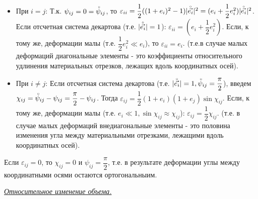 \begin{itemize}
  \item При $i = j$: Т.к. $\psi_{ij} = 0 = \accentset{\circ}{\psi}_{ij}$, то
        $\varepsilon_{ii} = \dfrac{1}{2}((1+e_i)^2 - 1)|\accentset{\circ}{\vec{e_i}}|^2 = (e_i + \dfrac{1}{2}e_i^2)|\accentset{\circ}{\vec{e_i}}|^2$.
        Если отсчетная система декартова (т.е. $|\accentset{\circ}{\vec{e_i}}| = 1$): $\varepsilon_{ii} = (e_i + \dfrac{1}{2}e_i^2)$. Если, к тому же, деформации малы (т.е. $\dfrac{1}{2}e_i^2 \ll e_i$), то $\varepsilon_{ii} = e_i$. (т.е.в случае малых деформаций диагональные элементы - это коэффициенты относительного удлинения материальных отрезков, лежащих вдоль координатных осей).
  \item При $i \not= j$: Если отсчетная система декартова (т.е. $|\accentset{\circ}{\vec{e_i}}| = 1, \accentset{\circ}{\psi}_{ij} = \dfrac{\pi}{2}$), введем $\chi_{ij} = \accentset{\circ}{\psi}_{ij} - \psi_{ij} = \dfrac{\pi}{2} - \psi_{ij}$. Тогда $\varepsilon_{ij} = \dfrac{1}{2}(1+e_i)(1+e_j)\sin{\chi_{ij}}$. Если, к тому же, деформации малы (т.е. $e_i \ll 1, \sin \chi_{ij} \approx \chi_{ij}$): $\varepsilon_{ij} = \dfrac{1}{2}\chi_{ij}$. (т.е. в случае малых деформаций внедиагональные элементы - это половина изменения угла между материальными отрезками, лежащими вдоль координатных осей).
\end{itemize}

Если $\varepsilon_{ij} = 0$, то $\chi_{ij} = 0$ и $\psi_{ij} = \dfrac{\pi}{2}$, т.е. в результате деформации углы между координатными осями остаются ортогональныим.

\begin{center}
  \textit{\underline{Относительное изменение объема.}}
\end{center}

